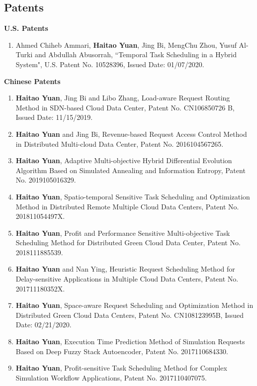 \documentclass[margin,line]{res}
\begin{document}
\begin{resume}
\section{\sc Patents}
{\bf U.S. Patents}
\begin{enumerate}
	\item Ahmed Chiheb Ammari, \textbf{Haitao Yuan}, Jing Bi, MengChu Zhou, Yusuf Al-Turki and Abdullah Abusorrah, ``Temporal Task Scheduling in a Hybrid System", U.S. Patent No. 10528396, Issued Date: 01/07/2020.
\end{enumerate}

{\bf Chinese Patents}
\begin{enumerate}
	\item \textbf{Haitao Yuan}, Jing Bi and Libo Zhang, Load-aware Request Routing Method in SDN-based Cloud Data Center, Patent No. CN106850726 B, Issued Date: 11/15/2019.
	\item \textbf{Haitao Yuan} and Jing Bi, Revenue-based Request Access Control Method in Distributed Multi-cloud Data Center, Patent No. 2016104567265.
	\item \textbf{Haitao Yuan}, Adaptive Multi-objective Hybrid Differential Evolution Algorithm Based on Simulated Annealing and Information Entropy, Patent No. 2019105016329.
	\item \textbf{Haitao Yuan}, Spatio-temporal Sensitive Task Scheduling and Optimization Method in Distributed Remote Multiple Cloud Data Centers, Patent No. 201811054497X.
	\item \textbf{Haitao Yuan}, Profit and Performance Sensitive Multi-objective Task Scheduling Method for Distributed Green Cloud Data Center, Patent No. 2018111885539.
	\item \textbf{Haitao Yuan} and Nan Ying, Heuristic Request Scheduling Method for Delay-sensitive Applications in Multiple Cloud Data Centers, Patent No. 201711180352X.
	\item \textbf{Haitao Yuan}, Space-aware Request Scheduling and Optimization Method in Distributed Green Cloud Data Centers, Patent No. CN108123995B, Issued Date: 02/21/2020.
	\item \textbf{Haitao Yuan}, Execution Time Prediction Method of Simulation Requests Based on Deep Fuzzy Stack Autoencoder, Patent No. 2017110684330.
	\item \textbf{Haitao Yuan}, Profit-sensitive Task Scheduling Method for Complex Simulation Workflow Applications, Patent No. 2017110407075.
\end{enumerate}


\end{resume}
\end{document}
